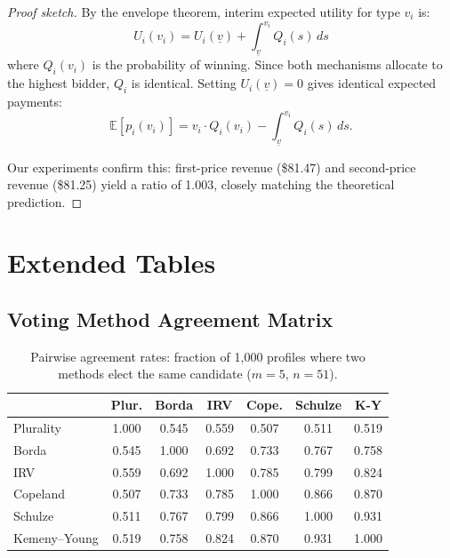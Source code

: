 \documentclass[10pt]{article}
\begin{document}
\begin{proof}[Proof sketch]
By the envelope theorem, interim expected utility for type $v_i$ is:
\begin{equation}
U_i(v_i) = U_i(\underline{v}) + \int_{\underline{v}}^{v_i} Q_i(s) \, ds
\end{equation}
where $Q_i(v_i)$ is the probability of winning. Since both mechanisms allocate to the highest bidder, $Q_i$ is identical. Setting $U_i(\underline{v}) = 0$ gives identical expected payments:
\begin{equation}
\mathbb{E}[p_i(v_i)] = v_i \cdot Q_i(v_i) - \int_{\underline{v}}^{v_i} Q_i(s) \, ds.
\end{equation}

Our experiments confirm this: first-price revenue (\$81.47) and second-price revenue (\$81.25) yield a ratio of 1.003, closely matching the theoretical prediction.
\end{proof}

\section{Extended Tables}
\label{app:tables}

\subsection{Voting Method Agreement Matrix}

\begin{table}[H]
\centering
\caption{Pairwise agreement rates: fraction of 1{,}000 profiles where two methods elect the same candidate ($m=5$, $n=51$).}
\label{tab:agreement}
\begin{tabular}{lcccccc}
\toprule
 & \textbf{Plur.} & \textbf{Borda} & \textbf{IRV} & \textbf{Cope.} & \textbf{Schulze} & \textbf{K-Y} \\
\midrule
Plurality    & 1.000 & 0.545 & 0.559 & 0.507 & 0.511 & 0.519 \\
Borda        & 0.545 & 1.000 & 0.692 & 0.733 & 0.767 & 0.758 \\
IRV          & 0.559 & 0.692 & 1.000 & 0.785 & 0.799 & 0.824 \\
Copeland     & 0.507 & 0.733 & 0.785 & 1.000 & 0.866 & 0.870 \\
Schulze      & 0.511 & 0.767 & 0.799 & 0.866 & 1.000 & 0.931 \\
Kemeny--Young& 0.519 & 0.758 & 0.824 & 0.870 & 0.931 & 1.000 \\
\bottomrule
\end{tabular}
\end{table}
\end{document}
